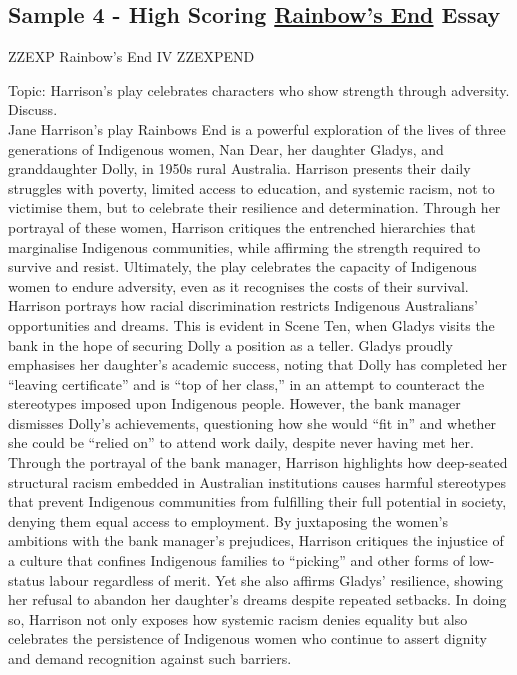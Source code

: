 \documentclass[a4paper]{article}
\begin{document}
\subsection{Sample 4 - High Scoring \underline{Rainbow's End} Essay}


ZZEXP Rainbow's End IV ZZEXPEND



Topic: Harrison's play celebrates characters who show strength through
adversity. Discuss.\\

Jane Harrison’s play Rainbows End is a powerful exploration of the lives of three
generations of Indigenous women, Nan Dear, her daughter Gladys, and granddaughter
Dolly, in 1950s rural Australia. Harrison presents their daily struggles with poverty, limited
access to education, and systemic racism, not to victimise them, but to celebrate their
resilience and determination. Through her portrayal of these women, Harrison critiques the
entrenched hierarchies that marginalise Indigenous communities, while affirming the
strength required to survive and resist. Ultimately, the play celebrates the capacity of
Indigenous women to endure adversity, even as it recognises the costs of their survival.\\

Harrison portrays how racial discrimination restricts Indigenous Australians’ opportunities
and dreams. This is evident in Scene Ten, when Gladys visits the bank in the hope of
securing Dolly a position as a teller. Gladys proudly emphasises her daughter’s academic
success, noting that Dolly has completed her “leaving certificate” and is “top of her class,” in
an attempt to counteract the stereotypes imposed upon Indigenous people. However, the
bank manager dismisses Dolly’s achievements, questioning how she would “fit in” and
whether she could be “relied on” to attend work daily, despite never having met her. Through
the portrayal of the bank manager, Harrison highlights how deep-seated structural racism
embedded in Australian institutions causes harmful stereotypes that prevent Indigenous
communities from fulfilling their full potential in society, denying them equal access to
employment. By juxtaposing the women’s ambitions with the bank manager’s prejudices,
Harrison critiques the injustice of a culture that confines Indigenous families to “picking” and
other forms of low-status labour regardless of merit. Yet she also affirms Gladys’ resilience,
showing her refusal to abandon her daughter’s dreams despite repeated setbacks. In doing
so, Harrison not only exposes how systemic racism denies equality but also celebrates the
persistence of Indigenous women who continue to assert dignity and demand recognition
against such barriers.\\
\end{document}
